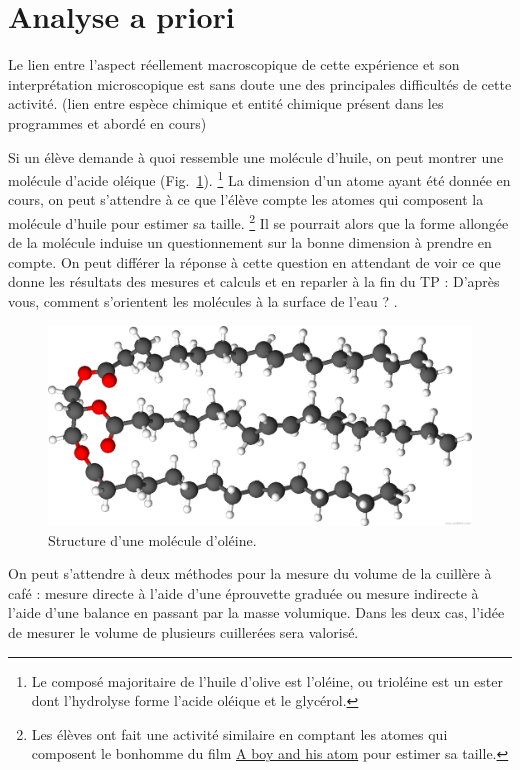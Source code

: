\documentclass[12pt,a4paper]{article}
\begin{document}
\section{Analyse a priori}

Le lien entre l'aspect réellement macroscopique de cette expérience et son interprétation microscopique est sans doute une des principales difficultés de cette activité.
(lien entre espèce chimique et entité chimique présent dans les programmes et abordé en cours)

Si un élève demande à quoi ressemble une molécule d'huile, on peut montrer une molécule d'acide oléique (Fig.~\ref{fig:oleine}).
\footnote{Le composé majoritaire de l'huile d'olive est l'oléine, ou trioléine est un ester dont l'hydrolyse forme l'acide oléique et le glycérol.}
La dimension d'un atome ayant été donnée en cours, on peut s'attendre à ce que l'élève compte les atomes qui composent la \og molécule d'huile \fg{} pour estimer sa taille.
\footnote{Les élèves ont fait une activité similaire en comptant les atomes qui composent le bonhomme du film \href{https://www.youtube.com/watch?v=oSCX78-8-q0}{A boy and his atom} pour estimer sa taille.}
Il se pourrait alors que la forme allongée de la molécule induise un questionnement sur la bonne dimension à prendre en compte.
On peut différer la réponse à cette question en attendant de voir ce que donne les résultats des mesures et calculs et en reparler à la fin du TP : \og D'après vous, comment s'orientent les molécules à la surface de l'eau ? \fg{}.

\begin{figure}
\center
\includegraphics[scale=0.35]{images/oleine.png}
\caption{Structure d'une molécule d'oléine.}
\label{fig:oleine}
\end{figure}

On peut s'attendre à deux méthodes pour la mesure du volume de la cuillère à café : mesure \og directe \fg{} à l'aide d'une éprouvette graduée ou mesure \og indirecte \fg{} à l'aide d'une balance en passant par la masse volumique.  
Dans les deux cas, l'idée de mesurer le volume de plusieurs cuillerées sera valorisé.
\end{document}
